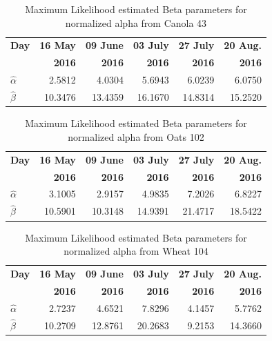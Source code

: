 \documentclass[journal]{IEEEtran}
\begin{document}
\begin{table}[hbt]
  \centering
  \caption{Maximum Likelihood estimated Beta parameters for normalized alpha from Canola 43}
  \label{tab:params_alpha_cn43}
  \begin{tabular}{lrrrrr}
    \toprule
    \textbf{Day} & \textbf{16 May} & \textbf{09 June} & \textbf{03 July} & \textbf{27 July} & \textbf{20 Aug.}\\ 
                 & \textbf{2016} & \textbf{2016} & \textbf{2016} & \textbf{2016} & \textbf{2016}\\\midrule
    \textbf{$\hat{\alpha}$} & 2.5812 & 4.0304 & 5.6943 & 6.0239 & 6.0750\\
    \textbf{$\hat{\beta}$} & 10.3476 & 13.4359 & 16.1670 & 14.8314 & 15.2520\\
    \bottomrule
  \end{tabular}
\end{table}

\begin{table}[hbt]
  \centering
  \caption{Maximum Likelihood estimated Beta parameters for normalized alpha from Oats 102}
  \label{tab:params_alpha_ot102}
  \begin{tabular}{lrrrrr}
    \toprule
    \textbf{Day} & \textbf{16 May} & \textbf{09 June} & \textbf{03 July} & \textbf{27 July} & \textbf{20 Aug.}\\ 
                 & \textbf{2016} & \textbf{2016} & \textbf{2016} & \textbf{2016} & \textbf{2016}\\\midrule
    \textbf{$\hat{\alpha}$} & 3.1005  & 2.9157 & 4.9835 & 7.2026 & 6.8227\\
    \textbf{$\hat{\beta}$} & 10.5901 & 10.3148 & 14.9391 & 21.4717 & 18.5422\\
    \bottomrule
  \end{tabular}
\end{table}

\begin{table}[hbt]
  \centering
  \caption{Maximum Likelihood estimated Beta parameters for normalized alpha from Wheat 104}
  \label{tab:params_alpha_wt104}
  \begin{tabular}{lrrrrr}
    \toprule
    \textbf{Day} & \textbf{16 May} & \textbf{09 June} & \textbf{03 July} & \textbf{27 July} & \textbf{20 Aug.}\\ 
                 & \textbf{2016} & \textbf{2016} & \textbf{2016} & \textbf{2016} & \textbf{2016}\\\midrule
    \textbf{$\hat{\alpha}$} & 2.7237 & 4.6521 & 7.8296 & 4.1457 & 5.7762\\
    \textbf{$\hat{\beta}$} & 10.2709 & 12.8761 & 20.2683 & 9.2153 & 14.3660\\
    \bottomrule
  \end{tabular}
\end{table}
\end{document}
